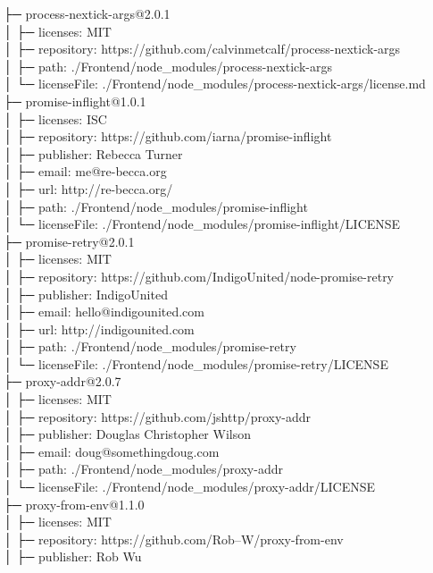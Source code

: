 ├─ process-nextick-args@2.0.1\\
│  ├─ licenses: MIT\\
│  ├─ repository: https://github.com/calvinmetcalf/process-nextick-args\\
│  ├─ path: ./Frontend/node\_modules/process-nextick-args\\
│  └─ licenseFile: ./Frontend/node\_modules/process-nextick-args/license.md\\
├─ promise-inflight@1.0.1\\
│  ├─ licenses: ISC\\
│  ├─ repository: https://github.com/iarna/promise-inflight\\
│  ├─ publisher: Rebecca Turner\\
│  ├─ email: me@re-becca.org\\
│  ├─ url: http://re-becca.org/\\
│  ├─ path: ./Frontend/node\_modules/promise-inflight\\
│  └─ licenseFile: ./Frontend/node\_modules/promise-inflight/LICENSE\\
├─ promise-retry@2.0.1\\
│  ├─ licenses: MIT\\
│  ├─ repository: https://github.com/IndigoUnited/node-promise-retry\\
│  ├─ publisher: IndigoUnited\\
│  ├─ email: hello@indigounited.com\\
│  ├─ url: http://indigounited.com\\
│  ├─ path: ./Frontend/node\_modules/promise-retry\\
│  └─ licenseFile: ./Frontend/node\_modules/promise-retry/LICENSE\\
├─ proxy-addr@2.0.7\\
│  ├─ licenses: MIT\\
│  ├─ repository: https://github.com/jshttp/proxy-addr\\
│  ├─ publisher: Douglas Christopher Wilson\\
│  ├─ email: doug@somethingdoug.com\\
│  ├─ path: ./Frontend/node\_modules/proxy-addr\\
│  └─ licenseFile: ./Frontend/node\_modules/proxy-addr/LICENSE\\
├─ proxy-from-env@1.1.0\\
│  ├─ licenses: MIT\\
│  ├─ repository: https://github.com/Rob--W/proxy-from-env\\
│  ├─ publisher: Rob Wu\\
